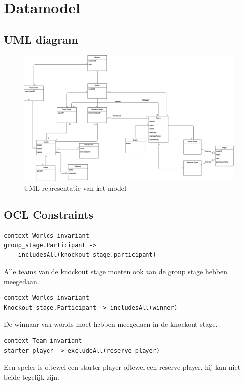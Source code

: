 \documentclass[12pt,a4paper]{article}
\begin{document}
			\section{Datamodel}
				\subsection{UML diagram}
				\begin{figure}[H]
					\includegraphics[width=\textwidth]{../4-Datamodel/RE.png}
					\caption{UML representatie van het model}
				\end{figure}
				\subsection{OCL Constraints}
\begin{lstlisting}[frame=single, language=OCL]
context Worlds invariant
group_stage.Participant ->
	includesAll(knockout_stage.participant)
\end{lstlisting}
Alle teams van de knockout stage moeten ook aan de group stage hebben meegedaan. \\

\begin{lstlisting}[frame=single, language=OCL]	
context Worlds invariant
Knockout_stage.Participant -> includesAll(winner)
\end{lstlisting}
De winnaar van worlds moet hebben meegedaan in de knockout stage. \\

\begin{lstlisting}[frame=single, language=OCL]
context Team invariant
starter_player -> excludeAll(reserve_player)
\end{lstlisting}
Een speler is oftewel een starter player oftewel een reserve player, hij kan niet beide tegelijk zijn. \\
\end{document}
